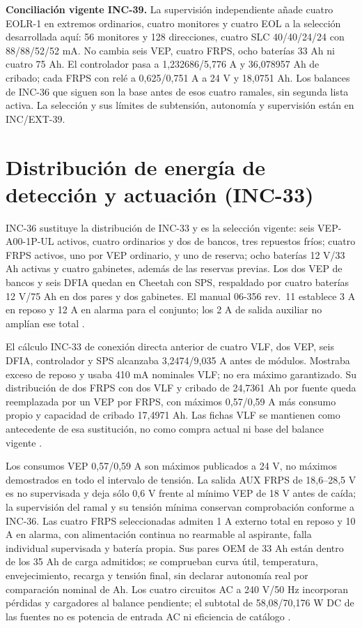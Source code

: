 \textbf{Conciliación vigente INC-39.} La supervisión independiente añade cuatro EOLR-1 en extremos ordinarios, cuatro monitores y cuatro EOL a la selección desarrollada aquí: 56 monitores y 128 direcciones, cuatro SLC 40/40/24/24 con 88/88/52/52 mA. No cambia seis VEP, cuatro FRPS, ocho baterías 33 Ah ni cuatro 75 Ah. El controlador pasa a 1,232686/5,776 A y 36,078957 Ah de cribado; cada FRPS con relé a 0,625/0,751 A a 24 V y 18,0751 Ah. Los balances de INC-36 que siguen son la base antes de esos cuatro ramales, sin segunda lista activa. La selección y sus límites de subtensión, autonomía y supervisión están en INC/EXT-39.

\section{Distribución de energía de detección y actuación (INC-33)}
\label{sec:sd4-inc33}
INC-36 sustituye la distribución de INC-33 y es la selección vigente: seis VEP-A00-1P-UL activos, cuatro ordinarios y dos de bancos, tres repuestos fríos; cuatro FRPS activos, uno por VEP ordinario, y uno de reserva; ocho baterías 12 V/33 Ah activas y cuatro gabinetes, además de las reservas previas. Los dos VEP de bancos y seis DFIA quedan en Cheetah con SPS, respaldado por cuatro baterías 12 V/75 Ah en dos pares y dos gabinetes. El manual 06-356 rev.~11 establece 3 A en reposo y 12 A en alarma para el conjunto; los 2 A de salida auxiliar no amplían ese total \parencite[secs.~2.1.1, 3.4.2 y ap.~A]{lote33-cheetah11}.

El cálculo INC-33 de conexión directa anterior de cuatro VLF, dos VEP, seis DFIA, controlador y SPS alcanzaba 3,2474/9,035 A antes de módulos. Mostraba exceso de reposo y usaba 410 mA nominales VLF; no era máximo garantizado. Su distribución de dos FRPS con dos VLF y cribado de 24,7361 Ah por fuente queda reemplazada por un VEP por FRPS, con máximos 0,57/0,59 A más consumo propio y capacidad de cribado 17,4971 Ah. Las fichas VLF se mantienen como antecedente de esa sustitución, no como compra actual ni base del balance vigente \parencite[p.~2]{l18-vlf500ul}\parencite[p.~2]{lote30-vep36106}\parencite[ficha~06-432-1-5-DF]{lote30-fike542}\parencite[pp.~1--2]{lote33-frps}.

Los consumos VEP 0,57/0,59 A son máximos publicados a 24 V, no máximos demostrados en todo el intervalo de tensión. La salida AUX FRPS de 18,6--28,5 V es no supervisada y deja sólo 0,6 V frente al mínimo VEP de 18 V antes de caída; la supervisión del ramal y su tensión mínima conservan comprobación conforme a INC-36. Las cuatro FRPS seleccionadas admiten 1 A externo total en reposo y 10 A en alarma, con alimentación continua no rearmable al aspirante, falla individual supervisada y batería propia. Sus pares OEM de 33 Ah están dentro de los 35 Ah de carga admitidos; se comprueban curva útil, temperatura, envejecimiento, recarga y tensión final, sin declarar autonomía real por comparación nominal de Ah. Los cuatro circuitos AC a 240 V/50 Hz incorporan pérdidas y cargadores al balance pendiente; el subtotal de 58,08/70,176 W DC de las fuentes no es potencia de entrada AC ni eficiencia de catálogo \parencite[p.~2]{lote33-frps}\parencite[ap.~A, notas~3--6]{lote33-cheetah11}.

